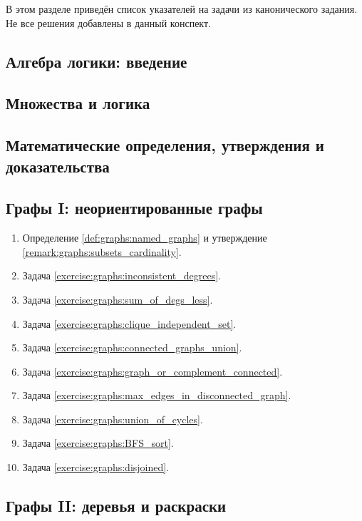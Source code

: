  \label{sec:exercises}

В этом разделе приведён список указателей на задачи из канонического задания.
Не все решения добавлены в данный конспект.

\subsection*{Алгебра логики: введение}

\subsection*{Множества и логика}

\subsection*{Математические определения, утверждения и доказательства}

\subsection*{Графы I: неориентированные графы}

\begin{enumerate}[label=\textbf{№\arabic*}:]
    \item Определение \ref{def:graphs:named_graphs} и утверждение \ref{remark:graphs:subsets_cardinality}.
    \item Задача \ref{exercise:graphs:inconsistent_degrees}.
    \item Задача \ref{exercise:graphs:sum_of_degs_less}.
    \item Задача \ref{exercise:graphs:clique_independent_set}.
    \item Задача \ref{exercise:graphs:connected_graphs_union}.
    \item Задача \ref{exercise:graphs:graph_or_complement_connected}.
    \item Задача \ref{exercise:graphs:max_edges_in_disconnected_graph}.
    \item Задача \ref{exercise:graphs:union_of_cycles}.
    \item Задача \ref{exercise:graphs:BFS_sort}.
    \item Задача \ref{exercise:graphs:disjoined}.
\end{enumerate}

\subsection*{Графы II: деревья и раскраски}

